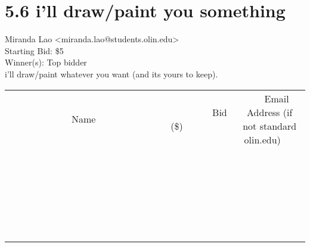 \documentclass[11pt]{article}
\begin{document}
					\section*{5.6 i'll draw/paint you something}
					Miranda Lao <miranda.lao@students.olin.edu> \\
					Starting Bid: \$5 \\
					Winner(s): Top bidder \\
					i'll draw/paint whatever you want (and its yours to keep). \\
					[6ex]
					\begin{tabular}{c c c}
						~~~~~~~~~~~~~Name~~~~~~~~~~~~~ & ~~~~~~~~~Bid (\$)~~~~~~~~~ & ~~~Email Address (if not standard olin.edu)~~~ \\
				
 & & \\
\hline
 & & \\
\hline
 & & \\
\hline
 & & \\
\hline
 & & \\
\hline
 & & \\
\hline
 & & \\
\hline
 & & \\
\hline
 & & \\
\hline
 & & \\
\hline
 & & \\
\hline
 & & \\
\hline
 & & \\
\hline
 & & \\
\hline
 & & \\
\hline
 & & \\
\hline
 & & \\
\hline
 & & \\
\hline
 & & \\
\hline
 & & \\
\hline
 & & \\
\hline
 & & \\
\hline
 & & \\
\hline
 & & \\
\hline
 & & \\
\hline
 & & \\
\hline
					\end{tabular}
					\clearpage
				
\end{document}
